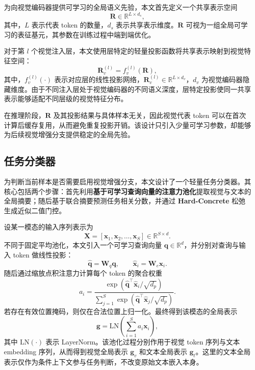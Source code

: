 \documentclass[journal]{IEEEtran}
\begin{document}
为向视觉编码器提供可学习的全局语义先验，本文首先定义一个共享表示空间
\begin{equation}
\mathbf{R}\in\mathbb{R}^{L\times d_s},
\end{equation}
其中，$L$ 表示代表 token 的数量，$d_s$ 表示共享表示维度。$\mathbf{R}$ 可视为一组全局可学习的表征基元，其参数在训练过程中端到端优化。

对于第 $l$ 个视觉注入层，本文使用层特定的轻量投影函数将共享表示映射到视觉特征空间：
\begin{equation}
\mathbf{R}^{(l)}_{v}=f^{(l)}_{v}(\mathbf{R}),
\end{equation}
其中，$f^{(l)}_{v}(\cdot)$ 表示对应层的线性投影网络，$\mathbf{R}^{(l)}_{v}\in\mathbb{R}^{L\times d_v}$，$d_v$ 为视觉编码器隐藏维度。由于不同注入层处于视觉编码器的不同语义深度，层特定投影使同一共享表示能够适配不同层级的视觉特征分布。

在推理阶段，$\mathbf{R}$ 及其投影结果与具体样本无关，因此视觉代表 token 可以在首次计算后缓存复用，从而避免重复投影开销。该设计只引入少量可学习参数，却能够为后续视觉增强分支提供稳定的全局先验。


\subsection{任务分类器}
\label{sec:task_classifier}

为判断当前样本是否需要启用视觉增强分支，本文设计了一个轻量任务分类器。其核心包括两个步骤：首先利用\textbf{基于可学习查询向量的注意力池化}提取视觉与文本的全局摘要；随后基于联合摘要预测任务相关分数，并通过 \textbf{Hard-Concrete} 松弛生成近似二值门控。\cite{louizos2017learning}

设某一模态的输入序列表示为
\begin{equation}
\mathbf{X}=[\mathbf{x}_1,\mathbf{x}_2,\ldots,\mathbf{x}_S]\in\mathbb{R}^{S\times d}.
\end{equation}
不同于固定平均池化，本文引入一个可学习查询向量 $\mathbf{q}\in\mathbb{R}^{d}$，并分别对查询与输入 token 做线性投影：
\begin{equation}
\hat{\mathbf{q}}=\mathbf{W}_q\mathbf{q},\qquad
\hat{\mathbf{x}}_i=\mathbf{W}_e\mathbf{x}_i.
\end{equation}
随后通过缩放点积注意力计算每个 token 的聚合权重
\begin{equation}
a_i=\frac{\exp\left(\hat{\mathbf{q}}^\top \hat{\mathbf{x}}_i/\sqrt{d_p}\right)}
{\sum_{j=1}^{S}\exp\left(\hat{\mathbf{q}}^\top \hat{\mathbf{x}}_j/\sqrt{d_p}\right)}.
\end{equation}
若存在有效位置掩码，则仅在合法位置上归一化。最终得到该模态的全局表示
\begin{equation}
\mathbf{g}=\mathrm{LN}\left(\sum_{i=1}^{S} a_i \mathbf{x}_i\right),
\end{equation}
其中 $\mathrm{LN}(\cdot)$ 表示 LayerNorm。该池化过程分别作用于视觉 token 序列与文本 embedding 序列，从而得到视觉全局表示 $\mathbf{g}_v$ 和文本全局表示 $\mathbf{g}_t$。这里的文本全局表示仅作为条件上下文参与任务判断，不改变原始文本嵌入本身。
\end{document}
